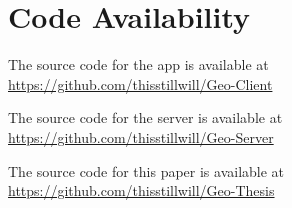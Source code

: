 \section*{Code Availability}

The source code for the app is available at\\\url{https://github.com/thisstillwill/Geo-Client}

The source code for the server is available at\\\url{https://github.com/thisstillwill/Geo-Server}

The source code for this paper is available at\\\url{https://github.com/thisstillwill/Geo-Thesis}
